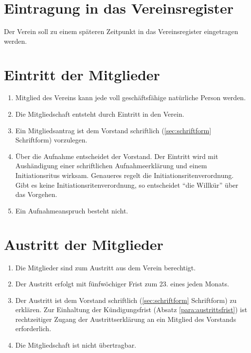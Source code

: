 \documentclass[a4paper]{article}
\begin{document}
\section{Eintragung in das Vereinsregister}\label{sec:eintragung_in_das_vereinsregister}

Der Verein soll zu einem späteren Zeitpunkt in das Vereinsregister eingetragen werden.


\section{Eintritt der Mitglieder}\label{sec:eintritt_der_mitglieder}

\begin{enumerate}
\item Mitglied des Vereins kann jede voll geschäftsfähige natürliche Person werden.
\item Die Mitgliedschaft entsteht durch Eintritt in den Verein.
\item Ein Mitgliedsantrag ist dem Vorstand schriftlich (\ref{sec:schriftform} Schriftform) vorzulegen.
\item Über die Aufnahme entscheidet der Vorstand. Der Eintritt wird mit Aushändigung einer schriftlichen Aufnahmeerklärung und einem Initiationsritus wirksam. Genaueres regelt die Initiationsritenverordnung. Gibt es keine Initiationsritenverordnung, so entscheidet "`die Willkür"' über das Vorgehen.
\item Ein Aufnahmeanspruch besteht nicht.
\end{enumerate}


\section{Austritt der Mitglieder}\label{sec:austritt_der_mitglieder}

\begin{enumerate}
\item Die Mitglieder sind zum Austritt aus dem Verein berechtigt.
\item Der Austritt erfolgt mit fünfwöchiger Frist zum 23. eines jeden Monats.\label{para:austrittsfrist}
\item Der Austritt ist dem Vorstand schriftlich (\ref{sec:schriftform} Schriftform) zu erklären. Zur Einhaltung der Kündigungsfrist (Absatz \ref{para:austrittsfrist}) ist rechtzeitiger Zugang der Austrittserklärung an ein Mitglied des Vorstands erforderlich.
\item Die Mitgliedschaft ist nicht übertragbar.
\end{enumerate}
\end{document}
